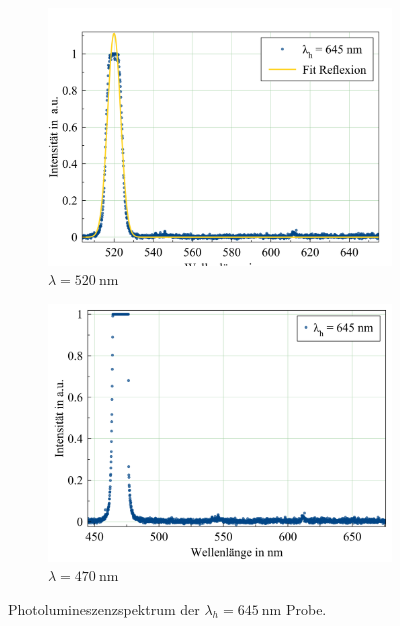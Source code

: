 \begin{figure}[H]
  \centering
  \begin{subfigure}{0.49\textwidth}
    \includegraphics[width=\textwidth]{plots/Weisslicht_645_520.png}
    \caption{$\lambda=\SI{520}{\nano\meter}$}
    \label{fig:645_520}
  \end{subfigure}
  \begin{subfigure}{0.49\textwidth}
    \includegraphics[width=\textwidth]{plots/Weisslicht_645_470.png}
    \caption{$\lambda=\SI{470}{\nano\meter}$}
    \label{fig:PL_645_470}
  \end{subfigure}
  \caption{Photolumineszenzspektrum der $\lambda_h=\SI{645}{\nano\meter}$ Probe.}
  \label{fig:PL_645}
\end{figure}
